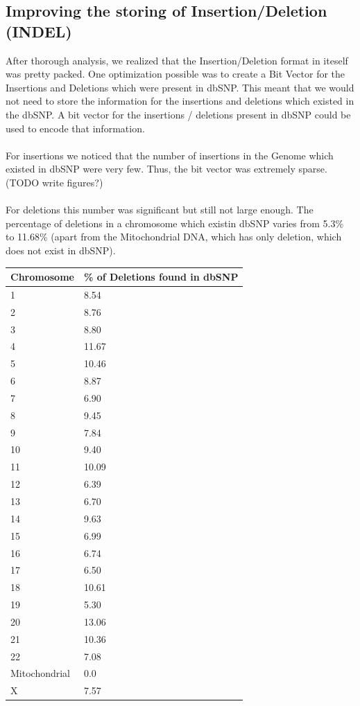 \documentclass{article}
\begin{document}
\subsection {Improving the storing of Insertion/Deletion (INDEL)}
After thorough analysis, we realized that the Insertion/Deletion format in iteself was pretty packed. One optimization possible was to create a Bit Vector for the Insertions and Deletions which were present in dbSNP. This meant that we would not need to store the information for the insertions and deletions which existed in the dbSNP. A bit vector for the insertions / deletions present in dbSNP could be used to encode that information.\\ 
\\
For insertions we noticed that the number of insertions in the Genome which existed in dbSNP were very few. Thus, the bit vector was extremely sparse. (TODO write figures?) \\
\\
For deletions this number was significant but still not large enough. The percentage of deletions in a chromosome which existin dbSNP varies from 5.3\% to 11.68\% (apart from the Mitochondrial DNA, which has only deletion, which does not exist in dbSNP).

\begin{center}
	\begin{tabular}{|p{1in}|p{1in}|}
	\caption {Percentage of Deletions in each chromosome found in dbSNP}
	\hline
	Chromosome	&		\% of Deletions found in dbSNP \\
	\hline
	1	&		8.54 \\
	\hline
	2	&		8.76 \\
	\hline
	3	&		8.80 \\
	\hline
	4	&	11.67 \\
	\hline
	5	&	10.46 \\
	\hline
	6	&	8.87 \\
	\hline
	7	&	6.90 \\
	\hline
	8	&	9.45 \\
	\hline
	9	&	7.84 \\
	\hline
	10	&	9.40 \\
	\hline
	11	&	10.09 \\
	\hline
	12	&	6.39 \\
	\hline
	13	&	6.70 \\
	\hline
	14	&	9.63 \\
	\hline
	15	&	6.99 \\
	\hline
	16	&	6.74 \\	
	\hline
	17	&	6.50 \\
	\hline	
	18	&	10.61 \\
	\hline	
	19	&	5.30 \\
	\hline
	20	&	13.06 \\	
	\hline
	21	&	10.36 \\
	\hline
	22	&	7.08  \\
	\hline
	Mitochondrial	&	0.0 \\
	\hline
	X	&	7.57 \\
	\hline
	\end{tabular}

\end{center}
\end{document}
